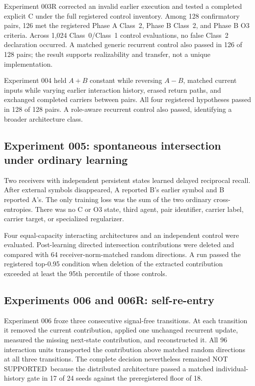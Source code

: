 \documentclass[11pt,a4paper]{article}
\newcommand{\statusnotsupported}{\textsf{NOT SUPPORTED}}
\begin{document}
Experiment 003R corrected an invalid earlier execution and tested a completed explicit C under the full registered control inventory. Among 128 confirmatory pairs, 126 met the registered Phase A Class~2, Phase B Class~2, and Phase B O3 criteria. Across 1,024 Class~0/Class~1 control evaluations, no false Class~2 declaration occurred. A matched generic recurrent control also passed in 126 of 128 pairs; the result supports realizability and transfer, not a unique implementation.

Experiment 004 held $A+B$ constant while reversing $A-B$, matched current inputs while varying earlier interaction history, erased return paths, and exchanged completed carriers between pairs. All four registered hypotheses passed in 128 of 128 pairs. A role-aware recurrent control also passed, identifying a broader architecture class.

\subsection{Experiment 005: spontaneous intersection under ordinary learning}

Two receivers with independent persistent states learned delayed reciprocal recall. After external symbols disappeared, A reported B's earlier symbol and B reported A's. The only training loss was the sum of the two ordinary cross-entropies. There was no C or O3 state, third agent, pair identifier, carrier label, carrier target, or specialized regularizer.

Four equal-capacity interacting architectures and an independent control were evaluated. Post-learning directed intersection contributions were deleted and compared with 64 receiver-norm-matched random directions. A run passed the registered top-0.95 condition when deletion of the extracted contribution exceeded at least the 95th percentile of those controls.

\subsection{Experiments 006 and 006R: self-re-entry}

Experiment 006 froze three consecutive signal-free transitions. At each transition it removed the current contribution, applied one unchanged recurrent update, measured the missing next-state contribution, and reconstructed it. All 96 interaction units transported the contribution above matched random directions at all three transitions. The complete decision nevertheless remained \statusnotsupported\ because the distributed architecture passed a matched individual-history gate in 17 of 24 seeds against the preregistered floor of 18.
\end{document}
